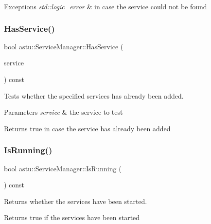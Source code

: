 \begin{DoxyExceptions}{Exceptions}
{\em std\+::logic\+\_\+error} & in case the service could not be found \\
\hline
\end{DoxyExceptions}
\mbox{\label{classastu_1_1ServiceManager_a34ae8a9d52eadd07571610502d20ba88}} 
\subsubsection{\texorpdfstring{Has\+Service()}{HasService()}}
{\footnotesize\ttfamily bool astu\+::\+Service\+Manager\+::\+Has\+Service (\begin{DoxyParamCaption}\item[{std\+::shared\+\_\+ptr$<$ \hyperlink{classastu_1_1IService}{I\+Service} $>$}]{service }\end{DoxyParamCaption}) const}

Tests whether the specified services has already been added.


\begin{DoxyParams}{Parameters}
{\em service} & the service to test \\
\hline
\end{DoxyParams}
\begin{DoxyReturn}{Returns}
{\ttfamily true} in case the service has already been added 
\end{DoxyReturn}
\mbox{\label{classastu_1_1ServiceManager_a64cea7132b9be6521a9af6f76009e5d4}} 
\subsubsection{\texorpdfstring{Is\+Running()}{IsRunning()}}
{\footnotesize\ttfamily bool astu\+::\+Service\+Manager\+::\+Is\+Running (\begin{DoxyParamCaption}{ }\end{DoxyParamCaption}) const}

Returns whether the services have been started.

\begin{DoxyReturn}{Returns}
{\ttfamily true} if the services have been started 
\end{DoxyReturn}
\mbox{\label{classastu_1_1ServiceManager_afdf1a0f9645daf376b094f8fb5c203c1}} 
